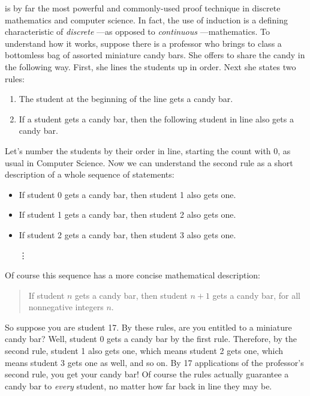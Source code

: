 
 is by far the most powerful and commonly-used proof technique in
discrete mathematics and computer science.  In fact, the use of induction
is a defining characteristic of \emph{discrete} ---as opposed to
\emph{continuous} ---mathematics.
%
To understand how it works, suppose there is a professor who brings
to class a bottomless bag of assorted miniature candy bars.  She offers to
share the candy in the following way.  First, she lines the students up in
order.  Next she states two rules:

\begin{enumerate}
\item The student at the beginning of the line gets a candy bar.
\item If a student gets a candy bar, then the following student in line
  also gets a candy bar.
\end{enumerate}
%
Let's number the students by their order in line, starting the count with
0, as usual in Computer Science.  Now we can understand the second rule as
a short description of a whole sequence of statements:
%
\begin{itemize}
\item If student 0 gets a candy bar, then student 1 also gets one.
\item If student 1 gets a candy bar, then student 2 also gets one.
\item If student 2 gets a candy bar, then student 3 also gets one.

\hspace{1.2in} \vdots
\end{itemize}
%
Of course this sequence has a more concise mathematical description:
\begin{quote}
  If student $n$ gets a candy bar, then student $n+1$ gets a
  candy bar, for all nonnegative integers $n$.
\end{quote}
So suppose you are student 17.  By these rules, are you entitled to a
miniature candy bar?  Well, student 0 gets a candy bar by the first rule.
Therefore, by the second rule, student 1 also gets one, which means
student 2 gets one, which means student 3 gets one as well, and so on.  By
17 applications of the professor's second rule, you get your candy bar!
Of course the rules actually guarantee a candy bar to \emph{every}
student, no matter how far back in line they may be.


